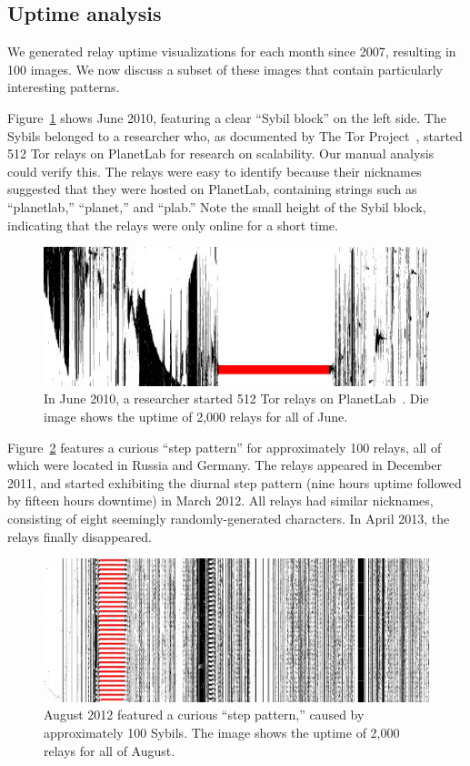 \subsection{Uptime analysis}
\label{sec:uptime}
We generated relay uptime visualizations for each month since 2007, resulting in
100 images.  We now discuss a subset of these images that contain particularly
interesting patterns.

Figure~\ref{fig:2010-06-planetlab} shows June 2010, featuring a clear ``Sybil
block'' on the left side.  The Sybils belonged to a researcher who, as
documented by The Tor Project~\cite{progressreport}, started 512 Tor relays on
PlanetLab for research on scalability.  Our manual analysis could verify this.
The relays were easy to identify because their nicknames suggested that they
were hosted on PlanetLab, containing strings such as ``planetlab,'' ``planet,''
and ``plab.''  Note the small height of the Sybil block, indicating that the
relays were only online for a short time.

\begin{figure}[t]
	\centering
	\includegraphics[width=\linewidth]{diagrams/2010-06.jpg}
	\caption{In June 2010, a researcher started 512 Tor relays on
		PlanetLab~\cite{progressreport}.  Die image shows the uptime of 2,000
		relays for all of June.}
	\label{fig:2010-06-planetlab}
\end{figure}

Figure~\ref{fig:2012-08-steppattern} features a curious ``step pattern'' for
approximately 100 relays, all of which were located in Russia and Germany.  The
relays appeared in December 2011, and started exhibiting the diurnal step
pattern (nine hours uptime followed by fifteen hours downtime) in March 2012.
All relays had similar nicknames, consisting of eight seemingly
randomly-generated characters.  In April 2013, the relays finally disappeared.

\begin{figure}[t]
	\centering
	\includegraphics[width=\linewidth]{diagrams/2012-08.jpg}
	\caption{August 2012 featured a curious ``step pattern,'' caused by
	approximately 100 Sybils.  The image shows the uptime of 2,000 relays for
	all of August.}
	\label{fig:2012-08-steppattern}
\end{figure}

